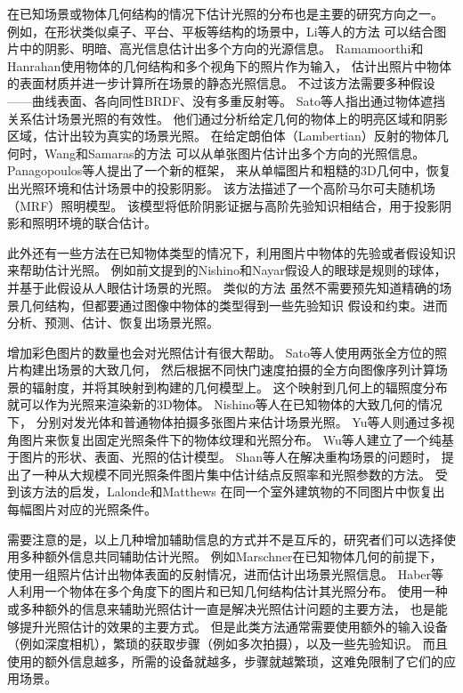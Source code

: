 在已知场景或物体几何结构的情况下估计光照的分布也是主要的研究方向之一。
例如，在形状类似桌子、平台、平板等结构的场景中，Li等人\cite{li2003multiple}的方法
可以结合图片中的阴影、明暗、高光信息估计出多个方向的光源信息。
Ramamoorthi和Hanrahan\cite{ramamoorthi2001signal}使用物体的几何结构和多个视角下的照片作为输入，
估计出照片中物体的表面材质并进一步计算所在场景的静态光照信息。
不过该方法需要多种假设——曲线表面、各向同性BRDF、没有多重反射等。
Sato等人\cite{sato2003illumination}指出通过物体遮挡关系估计场景光照的有效性。
他们通过分析给定几何的物体上的明亮区域和阴影区域，估计出较为真实的场景光照。
在给定朗伯体（Lambertian）反射的物体几何时，Wang和Samaras\cite{wang2002estimation}的方法
可以从单张图片估计出多个方向的光照信息。
Panagopoulos等人\cite{panagopoulos2011illumination}提出了一个新的框架，
来从单幅图片和粗糙的3D几何中，恢复出光照环境和估计场景中的投影阴影。
该方法描述了一个高阶马尔可夫随机场（MRF）照明模型。
该模型将低阶阴影证据与高阶先验知识相结合，用于投影阴影和照明环境的联合估计。

此外还有一些方法在已知物体类型的情况下，利用图片中物体的先验或者假设知识来帮助估计光照。
例如前文提到的Nishino和Nayar\cite{nishino2004eyes}假设人的眼球是规则的球体，
并基于此假设从人眼估计场景的光照。
类似的方法\cite{barron2015shape, lopez2010compositing, rematas2016deep}
虽然不需要预先知道精确的场景几何结构，但都要通过图像中物体的类型得到一些先验知识
假设和约束。进而分析、预测、估计、恢复出场景光照。

增加彩色图片的数量也会对光照估计有很大帮助。
Sato等人\cite{sato1999acquiring}使用两张全方位的照片构建出场景的大致几何，
然后根据不同快门速度拍摄的全方向图像序列计算场景的辐射度，并将其映射到构建的几何模型上。
这个映射到几何上的辐照度分布就可以作为光照来渲染新的3D物体。
Nishino等人\cite{nishino2001determining, nishino2005re}在已知物体的大致几何的情况下，
分别对发光体和普通物体拍摄多张图片来估计场景光照。
Yu等人\cite{yu2006sparse}则通过多视角图片来恢复出固定光照条件下的物体纹理和光照分布。
Wu等人\cite{wu2011high}建立了一个纯基于图片的形状、表面、光照的估计模型。
Shan等人\cite{shan2013visual}在解决重构场景的问题时，
提出了一种从大规模不同光照条件图片集中估计结点反照率和光照参数的方法。
受到该方法的启发，Lalonde和Matthews\cite{lalonde2014lighting}
在同一个室外建筑物的不同图片中恢复出每幅图片对应的光照条件。

需要注意的是，以上几种增加辅助信息的方式并不是互斥的，研究者们可以选择使用多种额外信息共同辅助估计光照。
例如Marschner\cite{marschner1997inverse}在已知物体几何的前提下，
使用一组照片估计出物体表面的反射情况，进而估计出场景光照信息。
Haber等人\cite{haber2009relighting}利用一个物体在多个角度下的图片和已知几何结构估计其光照分布。
使用一种或多种额外的信息来辅助光照估计一直是解决光照估计问题的主要方法，
也是能够提升光照估计的效果的主要方式。
但是此类方法通常需要使用额外的输入设备（例如深度相机），繁琐的获取步骤（例如多次拍摄），以及一些先验知识。
而且使用的额外信息越多，所需的设备就越多，步骤就越繁琐，这难免限制了它们的应用场景。


